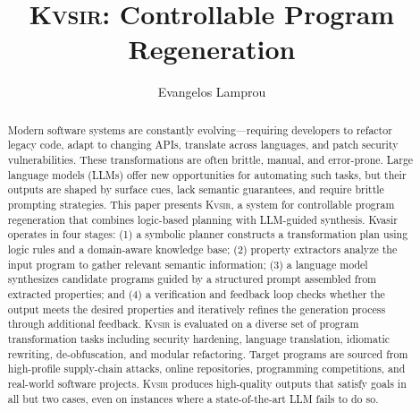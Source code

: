 \documentclass[sigplan,review,anonymous,10pt]{acmart}
\newcommand{\sys}{{\scshape Kv{\textalpha}sir}\xspace}
\begin{document}
\title{\sys: Controllable Program Regeneration}
\author{Evangelos Lamprou}



\begin{abstract}
Modern software systems are constantly evolving—requiring developers to
  refactor legacy code, adapt to changing APIs, translate across languages, and
  patch security vulnerabilities. These transformations are often brittle,
  manual, and error-prone. Large language models (LLMs) offer new opportunities
  for automating such tasks, but their outputs are shaped by surface cues, lack
  semantic guarantees, and require brittle prompting strategies. This paper
  presents \sys, a system for controllable program regeneration that combines
  logic-based planning with LLM-guided synthesis.
Kvasir operates in four stages: (1) a symbolic planner constructs a
transformation plan using logic rules and a domain-aware knowledge base; (2)
property extractors analyze the input program to gather relevant semantic
information; (3) a language model synthesizes candidate programs guided by
a structured prompt assembled from extracted properties; and (4) a verification
and feedback loop checks whether the output meets the desired properties and
iteratively refines the generation process through additional feedback.
\sys is evaluated on a diverse set of program transformation tasks
including security hardening, language translation, idiomatic rewriting, de-obfuscation,
and modular refactoring.
Target programs are sourced from high-profile supply-chain attacks, 
online repositories, programming competitions, and real-world software projects.
\sys produces high-quality outputs that satisfy goals in all but two cases,
even on instances where a state-of-the-art LLM fails to do so.
\end{abstract}
\maketitle
\end{document}

